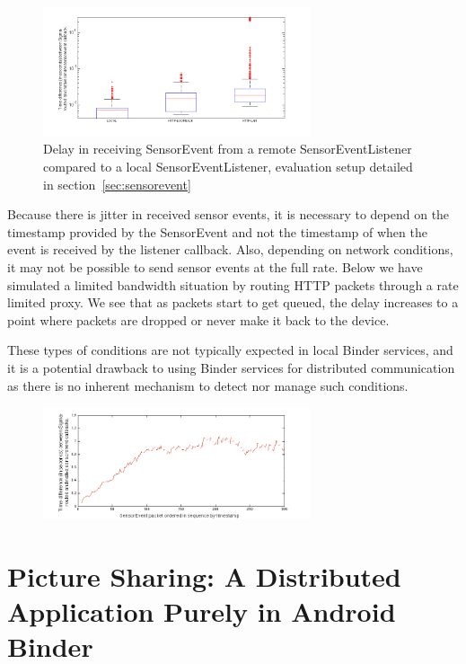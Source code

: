 \documentclass[prodmode]{acmlarge}
\begin{document}
\begin{figure}[h]
\centering
\includegraphics[width=0.7\textwidth]{plots/sensorevent_delay.png}
\caption{Delay in receiving SensorEvent from a remote SensorEventListener compared to a local SensorEventListener, evaluation setup detailed in section~\ref{sec:sensorevent}}
\label{fig:sensorevent}
\end{figure}

Because there is jitter in received sensor events, it is necessary to depend on the timestamp provided by the SensorEvent and not the timestamp of when the event is received by the listener callback. Also, depending on network conditions, it may not be possible to send sensor events at the full rate. Below we have simulated a limited bandwidth situation by routing HTTP packets through a rate limited proxy. We see that as packets start to get queued, the delay increases to a point where packets are dropped or never make it back to the device.

These types of conditions are not typically expected in local Binder services, and it is a potential drawback to using Binder services for distributed communication as there is no inherent mechanism to detect nor manage such conditions.

\begin{figure}[h]
\centering
\includegraphics[width=0.7\textwidth]{plots/limited_bandwidth_increasing_latency.png}
\end{figure}

\section{Picture Sharing: A Distributed Application Purely in Android Binder}
\end{document}
